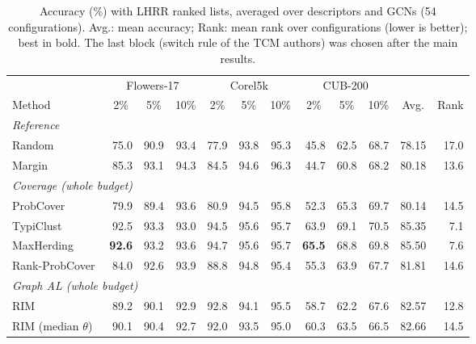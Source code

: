 \begin{table}[t]
\centering
\caption{Accuracy (\%) with LHRR ranked lists, averaged over descriptors and GCNs (54 configurations). Avg.: mean accuracy; Rank: mean rank over configurations (lower is better); best in bold. The last block (switch rule of the TCM authors) was chosen after the main results.}
\label{tab:sota-lhrr}
\footnotesize
\begin{adjustbox}{max width=\textwidth}
\begin{tabular}{lrrrrrrrrrrr}
\toprule
& \multicolumn{3}{c}{Flowers-17} & \multicolumn{3}{c}{Corel5k} & \multicolumn{3}{c}{CUB-200} & & \\
\cmidrule(lr){2-4}\cmidrule(lr){5-7}\cmidrule(lr){8-10}
Method & \multicolumn{1}{c}{2\%} & \multicolumn{1}{c}{5\%} & \multicolumn{1}{c}{10\%} & \multicolumn{1}{c}{2\%} & \multicolumn{1}{c}{5\%} & \multicolumn{1}{c}{10\%} & \multicolumn{1}{c}{2\%} & \multicolumn{1}{c}{5\%} & \multicolumn{1}{c}{10\%} & \multicolumn{1}{c}{Avg.} & \multicolumn{1}{c}{Rank} \\
\midrule
\multicolumn{12}{l}{\textit{Reference}} \\
\quad Random & 75.0 & 90.9 & 93.4 & 77.9 & 93.8 & 95.3 & 45.8 & 62.5 & 68.7 & 78.15 & 17.0 \\
\quad Margin~\cite{scheffer2001active} & 85.3 & 93.1 & 94.3 & 84.5 & 94.6 & 96.3 & 44.7 & 60.8 & 68.2 & 80.18 & 13.6 \\
\multicolumn{12}{l}{\textit{Coverage (whole budget)}} \\
\quad ProbCover~\cite{yehuda2022active} & 79.9 & 89.4 & 93.6 & 80.9 & 94.5 & 95.8 & 52.3 & 65.3 & 69.7 & 80.14 & 14.5 \\
\quad TypiClust~\cite{hacohen2022active} & 92.5 & 93.3 & 93.0 & 94.5 & 95.6 & 95.7 & 63.9 & 69.1 & 70.5 & 85.35 & 7.1 \\
\quad MaxHerding~\cite{bae2024generalized} & \textbf{92.6} & 93.2 & 93.6 & 94.7 & 95.6 & 95.7 & \textbf{65.5} & 68.8 & 69.8 & 85.50 & 7.6 \\
\quad Rank-ProbCover & 84.0 & 92.6 & 93.9 & 88.8 & 94.8 & 95.4 & 55.3 & 63.9 & 67.7 & 81.81 & 14.6 \\
\multicolumn{12}{l}{\textit{Graph AL (whole budget)}} \\
\quad RIM~\cite{zhang2021rim} & 89.2 & 90.1 & 92.9 & 92.8 & 94.1 & 95.5 & 58.7 & 62.2 & 67.6 & 82.57 & 12.8 \\
\quad RIM (median $\theta$)~\cite{zhang2021rim} & 90.1 & 90.4 & 92.7 & 92.0 & 93.5 & 95.0 & 60.3 & 63.5 & 66.5 & 82.66 & 14.5 \\

\end{tabular}
\end{adjustbox}
\end{table}

